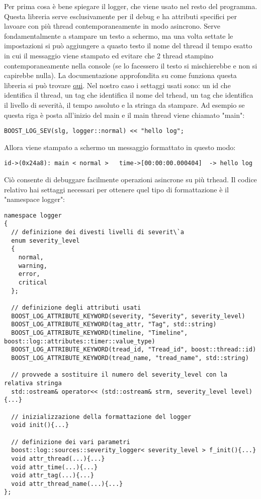 \documentclass[10pt,a4paper]{article}
\begin{document}
Per prima cosa \`e bene spiegare il logger, che viene usato nel resto del programma. Questa libreria serve esclusivamente per il debug e ha attributi specifici per lavoare con pi\`u thread contemporaneamente in modo asincrono. Serve fondamentalmente a stampare un testo a schermo, ma una volta settate le impostazioni si pu\`o aggiungere a quasto testo il nome del thread il tempo esatto in cui il messaggio viene stampato ed evitare che 2 thread stampino contemporaneamente nella console (se lo facessero il testo si mischierebbe e non si capirebbe nulla). La documentazione approfondita su come funziona questa libreria si pu\`o trovare \href{https://www.boost.org/doc/libs/1_69_0/libs/log/doc/html/index.html#log.moti}{qui}. Nel nostro caso i settaggi usati sono: un id che identifica il thread, un tag che identifica il nome del trhead, un tag che identifica il livello di severit\`a, il tempo assoluto e la stringa da stampare. Ad esempio se questa riga \`e posta all'inizio del main e il main thread viene chiamato "main":
%
\begin{lstlisting}[style=mycpp, caption=librerie usate, captionpos=b]
BOOST_LOG_SEV(slg, logger::normal) << "hello log";
\end{lstlisting}
%
Allora viene stampato a schermo un messaggio formattato in questo modo:
%
\begin{lstlisting}[style=myoutput, caption=librerie usate, captionpos=b]
id->(0x24a8): main < normal >   time->[00:00:00.000404]  -> hello log
\end{lstlisting}
%
Ci\`o consente di debuggare facilmente operazioni asincrone su pi\`u trhead.
Il codice relativo hai settaggi necessari per ottenere quel tipo di formattazione \`e il "namespace logger":
\begin{lstlisting}[style=mycpp, caption=librerie usate, captionpos=b]
namespace logger
{
  // definizione dei divesti livelli di severit\`a
  enum severity_level
  {
    normal,
    warning,
    error,
    critical
  };
  
  // definizione degli attributi usati
  BOOST_LOG_ATTRIBUTE_KEYWORD(severity, "Severity", severity_level)
  BOOST_LOG_ATTRIBUTE_KEYWORD(tag_attr, "Tag", std::string)
  BOOST_LOG_ATTRIBUTE_KEYWORD(timeline, "Timeline", boost::log::attributes::timer::value_type)
  BOOST_LOG_ATTRIBUTE_KEYWORD(tread_id, "Tread_id", boost::thread::id)
  BOOST_LOG_ATTRIBUTE_KEYWORD(tread_name, "tread_name", std::string)

  // provvede a sostituire il numero del severity_level con la relativa stringa
  std::ostream& operator<< (std::ostream& strm, severity_level level){...}

  // inizializzazione della formattazione del logger
  void init(){...}

  // definizione dei vari parametri
  boost::log::sources::severity_logger< severity_level > f_init(){...}
  void attr_thread(...){...}
  void attr_time(...){...}
  void attr_tag(...){...}
  void attr_thread_name(...){...}
};
\end{lstlisting}
\end{document}
